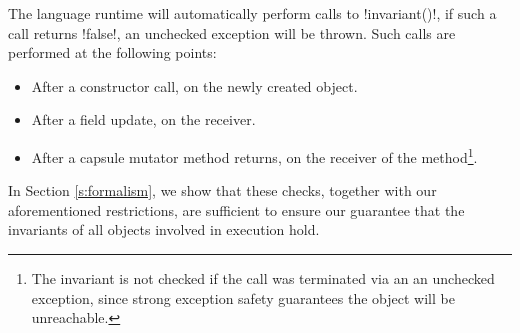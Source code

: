






The language runtime will automatically perform calls to \Q!invariant()!, if such a call returns \Q!false!, an unchecked exception will be thrown. Such calls are performed at the following points:
\begin{itemize}
	\item After a constructor call, on the newly created object.
	\item After a field update, on the receiver.
	\item After a capsule mutator method returns, on the receiver of the method\footnote{The invariant is not checked if the call was terminated via an an unchecked exception, since strong exception safety guarantees the object will be unreachable.}.
\end{itemize}
\noindent In Section \ref{s:formalism}, we show that these checks, together with our aforementioned restrictions, are sufficient to ensure our guarantee that the invariants of all objects involved in execution hold. %

